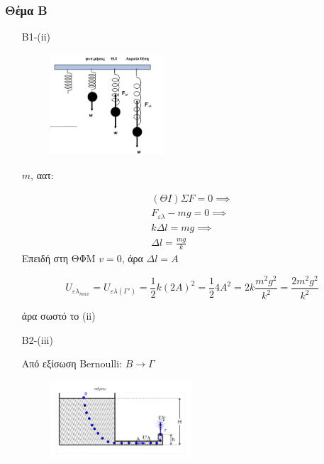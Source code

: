 \documentclass[12pt]{article}
\begin{document}
  \part*{}

  \section*{Θέμα Β}
  \begin{enumerate}
    \item [B1-(ii)]

    \begin{figure}[h]
      \includegraphics[width=0.4\textwidth]{ΦυσικήΒ1.png}
      \centering
    \end{figure}

    $m$, αατ:

    \begin{gather*}
    (ΘΙ) ΣF=0 \implies \\ F_{ελ}-mg=0 \implies \\ kΔl=mg \implies \\ Δl=\frac{mg}{k}
    \end{gather*}
    Επειδή στη ΘΦΜ $v=0$, άρα $Δl=A$



    $$U_{ελ_{max}}= U_{ελ(Γ')}=\frac{1}{2}k\left(2A\right)^2=\frac{1}{2}4A^2=2k\frac{m^2g^2}{k^2}=\frac{2m^2g^2}{k^2}$$

    άρα σωστό το (ii)

    \item [B2-(iii)]

    Από εξίσωση Bernoulli: $Β\to Γ$
    \begin{figure}[h]
      \includegraphics[width=0.5\textwidth]{ΦυσικήΒ2.png}
      \centering
    \end{figure}


\end{enumerate}
\end{document}
